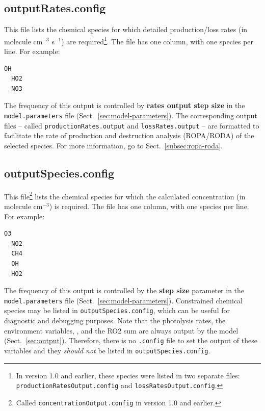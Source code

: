 \subsection{outputRates.config} \label{subsec:outputrates}

This file lists the chemical species for which detailed production/loss rates (in molecule
cm$^{-3}$ s$^{-1}$) are required\footnote{In version 1.0 and earlier, these species were
  listed in two separate files: \texttt{productionRatesOutput.config} and
  \texttt{lossRatesOutput.config}.}. The file has one column, with one species per line. For
example:

\begin{Verbatim}[fontsize=\small]
  OH
  HO2
  NO3
\end{Verbatim}

The frequency of this output is controlled by \textbf{rates output step size} in the
\texttt{model.parameters} file (Sect.~\ref{sec:model-parameters}). The corresponding output
files -- called \texttt{productionRates.output} and \texttt{lossRates.output} -- are formatted
to facilitate the rate of production and destruction analysis (ROPA/RODA) of the selected
species. For more information, go to Sect.~\ref{subsec:ropa-roda}.

\subsection{outputSpecies.config} \label{subsec:outputspecies}

This file\footnote{Called \texttt{concentrationOutput.config} in version 1.0 and earlier.}
lists the chemical species for which the calculated concentration (in molecule cm$^{-3}$) is
required. The file has one column, with one species per line. For example:

\begin{Verbatim}[fontsize=\small]
  O3
  NO2
  CH4
  OH
  HO2
\end{Verbatim}

The frequency of this output is controlled by the \textbf{step size} parameter in the
\texttt{model.parameters} file (Sect.~\ref{sec:model-parameters}). Constrained chemical species
may be listed in \texttt{outputSpecies.config}, which can be useful for diagnostic and
debugging purposes. Note that the photolysis rates, the environment variables, , and
the RO2 sum are always output by the model (Sect.~\ref{sec:output}). Therefore, there is no
\texttt{.config} file to set the output of these variables and they \emph{should not} be listed
in \texttt{outputSpecies.config}.

